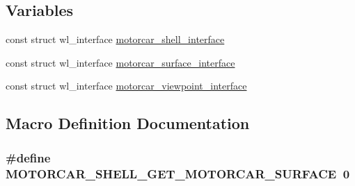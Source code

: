 \subsection*{Variables}
\begin{DoxyCompactItemize}
\item 
const struct wl\-\_\-interface \hyperlink{protocol_2motorcar-client-protocol_8h_a4decf5a74ff7a553e7cb41be3a9c580e}{motorcar\-\_\-shell\-\_\-interface}
\item 
const struct wl\-\_\-interface \hyperlink{protocol_2motorcar-client-protocol_8h_ae2e8f3ce5b87226a6df640361441f5ce}{motorcar\-\_\-surface\-\_\-interface}
\item 
const struct wl\-\_\-interface \hyperlink{protocol_2motorcar-client-protocol_8h_a90843869d07a9812f0b0eb66ed03ed20}{motorcar\-\_\-viewpoint\-\_\-interface}
\end{DoxyCompactItemize}


\subsection{Macro Definition Documentation}
\hypertarget{protocol_2motorcar-client-protocol_8h_a99bdc7c0bb1a6088577cfe9c263b33a4}{
\subsubsection[{M\-O\-T\-O\-R\-C\-A\-R\-\_\-\-S\-H\-E\-L\-L\-\_\-\-G\-E\-T\-\_\-\-M\-O\-T\-O\-R\-C\-A\-R\-\_\-\-S\-U\-R\-F\-A\-C\-E}]{\setlength{\rightskip}{0pt plus 5cm}\#define M\-O\-T\-O\-R\-C\-A\-R\-\_\-\-S\-H\-E\-L\-L\-\_\-\-G\-E\-T\-\_\-\-M\-O\-T\-O\-R\-C\-A\-R\-\_\-\-S\-U\-R\-F\-A\-C\-E~0}}\label{protocol_2motorcar-client-protocol_8h_a99bdc7c0bb1a6088577cfe9c263b33a4}


